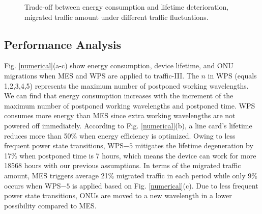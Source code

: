 \documentclass[letter]{IEEEtran}
\begin{document}
\begin{figure*}[h]
  \setlength{\abovecaptionskip}{-1.0mm}
    \centering 
    \caption{Trade-off between energy consumption and lifetime deterioration, migrated traffic amount under different traffic fluctuations.} 
    \label{numerical_2} 
    \vspace{-6.0mm}
\end{figure*}

\vspace{-5.0mm}
\subsection{Performance Analysis}
Fig. \ref{numerical}(a-c) show energy consumption, device lifetime, and ONU migrations when MES and WPS are applied to traffic-III. The $n$ in WPS (equals 1,2,3,4,5) represents the maximum number of postponed working wavelengths. We can find that energy consumption increases with the increment of the maximum number of postponed working wavelengths and postponed time. WPS consumes more energy than MES since extra working wavelengths are not powered off immediately. According to Fig. \ref{numerical}(b), a line card's lifetime reduces more than 50\% when energy efficiency is optimized. Owing to less frequent power state transitions, WPS$ -5 $ mitigates the lifetime degeneration by 17\% when postponed time is 7 hours, which means the device can work for more 18568 hours with our previous assumptions. In terms of the migrated traffic amount, MES triggers average 21\% migrated traffic in each period while only 9\% occurs when WPS$ -5 $ is applied based on Fig. \ref{numerical}(c). Due to less frequent power state transitions, ONUs are moved to a new wavelength in a lower possibility compared to MES.
\end{document}

